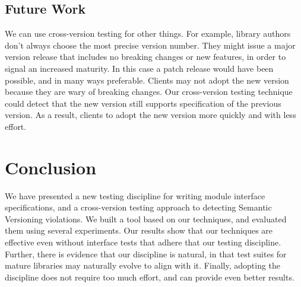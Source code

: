 \subsection{Future Work}
We can use cross-version testing for other things. For
example, library authors don't always choose the most precise version
number. They might issue a major version release that includes no
breaking changes or new features, in order to signal an increased
maturity. In this case a patch release would have been possible, and
in many ways preferable. Clients may not adopt the new version because
they are wary of breaking changes. Our cross-version testing technique
could detect that the new version still supports specification of the
previous version. As a result, clients to adopt the new version more
quickly and with less effort.


\section{Conclusion} 
We have presented a new testing discipline for writing module
interface specifications, and a cross-version testing approach to
detecting Semantic Versioning violations. We built a tool based on our
techniques, and evaluated them using several experiments. Our results
show that our techniques are effective even without interface tests
that adhere that our testing discipline.  Further, there is evidence
that our discipline is natural, in that test suites for mature
libraries may naturally evolve to align with it. Finally, adopting the
discipline does not require too much effort, and can provide even
better results.

